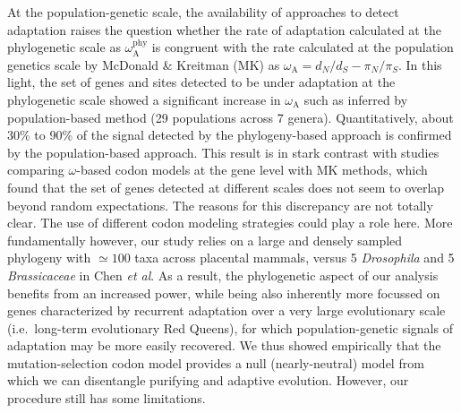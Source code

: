 \documentclass[9pt,twocolumn,twoside,lineno]{pnas-new}
\newcommand{\dn}{d_N}
\newcommand{\ds}{d_S}
\newcommand{\dnds}{\dn / \ds}
\newcommand{\rateApop}{\omega_{\mathrm{A}}}
\newcommand{\rateAphy}{\rateApop^{\mathrm{phy}}}
\newcommand{\pn}{\pi_N}
\newcommand{\ps}{\pi_S}
\newcommand{\pnps}{\pn / \ps}
\begin{document}
At the population-genetic scale, the availability of approaches to detect adaptation\cite{mcdonald_adaptative_1991, messer_frequent_2013} raises the question whether the rate of adaptation calculated at the phylogenetic scale as $\rateAphy$ is congruent with the rate calculated at the population genetics scale by McDonald \& Kreitman (MK)\cite{mcdonald_adaptative_1991} as $\rateApop = \dnds - \pnps$.
In this light, the set of genes and sites detected to be under adaptation at the phylogenetic scale showed a significant increase in $\rateApop$ such as inferred by population-based method (29 populations across 7 genera).
Quantitatively, about 30\% to 90\% of the signal detected by the phylogeny-based approach is confirmed by the population-based approach.
This result is in stark contrast with studies comparing $\omega$-based codon models at the gene level with MK methods, which found that the set of genes detected at different scales does not seem to overlap beyond random expectations\cite{chen_two_2021}.
The reasons for this discrepancy are not totally clear.
The use of different codon modeling strategies could play a role here.
More fundamentally however, our study relies on a large and densely sampled phylogeny with $\simeq 100$ taxa across placental mammals, versus 5 \textit{Drosophila} and 5 \textit{Brassicaceae} in Chen \textit{et al}\cite{chen_two_2021}.
As a result, the phylogenetic aspect of our analysis benefits from an increased power, while being also inherently more focussed on genes characterized by recurrent adaptation over a very large evolutionary scale (i.e.~long-term evolutionary Red Queens), for which population-genetic signals of adaptation may be more easily recovered.
We thus showed empirically that the mutation-selection codon model provides a null (nearly-neutral) model from which we can disentangle purifying and adaptive evolution.
However, our procedure still has some limitations.
\end{document}
